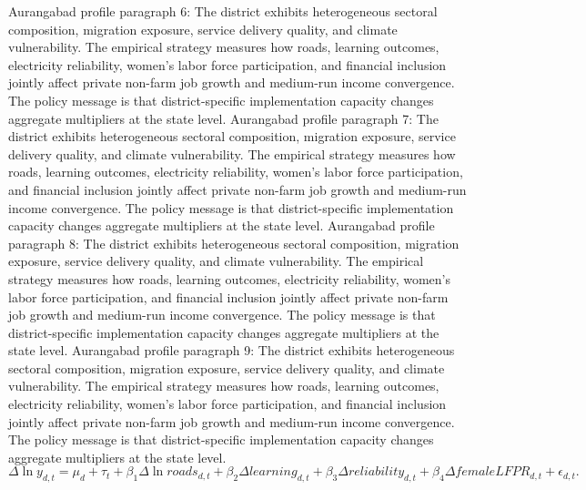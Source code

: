 \documentclass[preprint,12pt]{elsarticle}
\begin{document}
Aurangabad profile paragraph 6: The district exhibits heterogeneous sectoral composition, migration exposure, service delivery quality, and climate vulnerability. The empirical strategy measures how roads, learning outcomes, electricity reliability, women's labor force participation, and financial inclusion jointly affect private non-farm job growth and medium-run income convergence. The policy message is that district-specific implementation capacity changes aggregate multipliers at the state level.
Aurangabad profile paragraph 7: The district exhibits heterogeneous sectoral composition, migration exposure, service delivery quality, and climate vulnerability. The empirical strategy measures how roads, learning outcomes, electricity reliability, women's labor force participation, and financial inclusion jointly affect private non-farm job growth and medium-run income convergence. The policy message is that district-specific implementation capacity changes aggregate multipliers at the state level.
Aurangabad profile paragraph 8: The district exhibits heterogeneous sectoral composition, migration exposure, service delivery quality, and climate vulnerability. The empirical strategy measures how roads, learning outcomes, electricity reliability, women's labor force participation, and financial inclusion jointly affect private non-farm job growth and medium-run income convergence. The policy message is that district-specific implementation capacity changes aggregate multipliers at the state level.
Aurangabad profile paragraph 9: The district exhibits heterogeneous sectoral composition, migration exposure, service delivery quality, and climate vulnerability. The empirical strategy measures how roads, learning outcomes, electricity reliability, women's labor force participation, and financial inclusion jointly affect private non-farm job growth and medium-run income convergence. The policy message is that district-specific implementation capacity changes aggregate multipliers at the state level.
\begin{equation}\Delta \ln y_{d,t}=\mu_d+\tau_t+\beta_1\Delta\ln roads_{d,t}+\beta_2\Delta learning_{d,t}+\beta_3\Delta reliability_{d,t}+\beta_4\Delta femaleLFPR_{d,t}+\epsilon_{d,t}.\end{equation}
\end{document}
